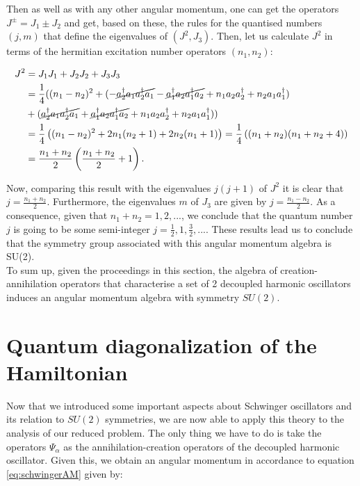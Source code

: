 Then as well as with any other angular momentum, one can get the operators $J^\pm = J_1\pm J_2$ and get, based on these, the rules for the quantised numbers $(j,m)$ that define the eigenvalues of $(J^2,J_3)$. Then, let us calculate $J^2$ in terms of the hermitian excitation number operators $(n_1,n_2)$:

\begin{align*}
J^2 &= J_1J_1+J_2J_2+J_3J_3\\
&= \frac{1}{4}( (n_1-n_2)^2 +(-\cancel{a_2^\dagger a_1a_2^\dagger a_1}- \cancel{a_1^\dagger a_2a_1^\dagger a_2}+n_1a_2a_2^\dagger+n_2a_1a_1^\dagger)\\
&+(\cancel{a_2^\dagger a_1a_2^\dagger a_1}+ \cancel{a_1^\dagger a_2a_1^\dagger a_2}+n_1a_2a_2^\dagger+n_2a_1a_1^\dagger))\\
&= \frac{1}{4}\left( (n_1-n_2)^2 + 2n_1(n_2+1)+2n_2(n_1+1) \right) = \frac{1}{4}\left( (n_1+n_2)(n_1+n_2+4) \right)\\
&= \frac{n_1+n_2}{2}\left( \frac{n_1+n_2}{2}+1 \right).
\end{align*}

Now, comparing this result with the eigenvalues $j(j+1)$ of $J^2$ it is clear that $j = \frac{n_1+n_2}{2}$. Furthermore, the eigenvalues $m$ of $J_3$ are given by  $j = \frac{n_1-n_2}{2}$. As a consequence, given that $n_1+n_2 = 1,2,...$, we conclude that the quantum number $j$ is going to be some semi-integer $j= \frac{1}{2},1,\frac{3}{2},...$. These results lead us to conclude that the symmetry group associated with this angular momentum algebra is SU(2).\\

To sum up, given the proceedings in this section, the algebra of creation-annihilation operators that characterise a set of 2 decoupled harmonic oscillators induces an angular momentum algebra with symmetry $SU(2)$.

\section{Quantum diagonalization of the Hamiltonian}
Now that we introduced some important aspects about Schwinger oscillators and its relation to $SU(2)$ symmetries, we are now able to apply this theory to the analysis of our reduced problem. The only thing we have to do is take the operators $\Psi_\alpha$ as the annihilation-creation operators of the decoupled harmonic oscillator. Given this, we obtain an angular momentum in accordance to equation \eqref{eq:schwingerAM} given by:

